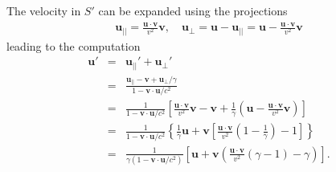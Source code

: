 \documentclass [12pt, a4paper] {article}
\newcommand{\vc}[1]
{
	\boldsymbol{#1}
}
\begin{document}
The velocity in $S'$ can be expanded using the projections
\begin {eqnarray}
    \vc u_{||}=\frac{\vc u\cdot\vc v}{v^2}\vc v,
    \quad 
    \vc u_\perp = \vc u - \vc u_{||} = \vc u - \frac{\vc u\cdot\vc v}{v^2}\vc v
\end {eqnarray}
leading to the computation
\begin {eqnarray}
    \vc u' &=& \vc u_{||}' + \vc u_\perp'
    \\
    &=& 
    \frac{\vc u_{||} - \vc v + \vc u_\perp/\gamma}{1 - \vc v\cdot\vc u/c^2}
    \\
    &=& 
    \frac{1}{1 - \vc v\cdot\vc u/c^2}
    \left[
        \frac{\vc u\cdot\vc v}{v^2}\vc v 
        - \vc v
        + \frac{1}{\gamma}\left(
            \vc u - \frac{\vc u\cdot\vc v}{v^2}\vc v
        \right)
    \right]
    \\
    &=& 
    \frac{1}{1 - \vc v\cdot\vc u/c^2}
    \left\{
        \frac{1}{\gamma}\vc u
        +
        \vc v 
        \left[
             \frac{\vc u\cdot\vc v}{v^2}\left(1 - \frac{1}{\gamma}\right) - 1
        \right]
    \right\}
    \\
    \label{eq:vector_lorentz_vel}
    &=& 
    \frac{1}{\gamma(1 - \vc v\cdot\vc u/c^2)}
    \left[
        \vc u
        +
        \vc v 
        \left(
             \frac{\vc u\cdot\vc v}{v^2}\left(\gamma - 1\right) - \gamma
        \right)
    \right].
\end {eqnarray}
\end{document}
